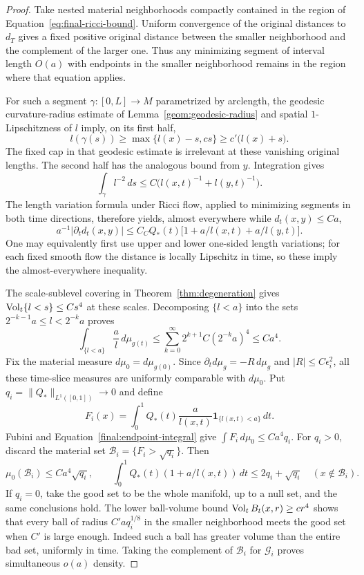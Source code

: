 \begin{proof}
Take nested material neighborhoods compactly contained in the region
of Equation~\eqref{eq:final-ricci-bound}.  Uniform convergence of the
original distances to $d_T$ gives a fixed positive original distance
between the smaller neighborhood and the complement of the larger
one.  Thus any minimizing segment of interval length $O(a)$ with
endpoints in the smaller neighborhood remains in the region where
that equation applies.

For such a segment $\gamma:[0,L]\to M$ parametrized by arclength,
the geodesic curvature-radius estimate of
Lemma~\ref{geom:geodesic-radius} and spatial $1$-Lipschitzness of $l$
imply, on its first half,
\[
 l(\gamma(s))\ge \max\{l(x)-s,cs\}
                  \ge c'\bigl(l(x)+s\bigr).
\]
The fixed cap in that geodesic estimate is irrelevant at these
vanishing original lengths.  The second half has the analogous
bound from $y$.  Integration gives
\begin{equation}\label{final:geodesic-integral}
 \int_\gamma l^{-2}\,ds
          \le C\bigl(l(x,t)^{-1}+l(y,t)^{-1}\bigr).
\end{equation}
The length variation formula under Ricci flow, applied to minimizing
segments in both time directions, therefore yields, almost everywhere
while $d_t(x,y)\le Ca$,
\begin{equation}\label{final:distance-derivative}
 a^{-1}|\partial_t d_t(x,y)|
 \le C_C Q_*(t)
         \bigl[1+a/l(x,t)+a/l(y,t)\bigr].
\end{equation}
One may equivalently first use upper and lower one-sided length
variations; for each fixed smooth flow the distance is locally
Lipschitz in time, so these imply the almost-everywhere inequality.

The scale-sublevel covering in Theorem~\ref{thm:degeneration} gives
$\operatorname{Vol}_t\{l<s\}\le Cs^4$ at these scales.  Decomposing $\{l<a\}$
into the sets $2^{-k-1}a\le l<2^{-k}a$ proves
\begin{equation}\label{final:endpoint-integral}
 \int_{\{l<a\}}\frac a l\,d\mu_{g(t)}
 \le\sum_{k=0}^\infty 2^{k+1}C(2^{-k}a)^4
 \le Ca^4.
\end{equation}
Fix the material measure $d\mu_0=d\mu_{g(0)}$.  Since
$\partial_t d\mu_g=-R\,d\mu_g$ and $|R|\le C\epsilon_i^2$,
all these time-slice measures are uniformly comparable with $d\mu_0$.
Put $q_i=\|Q_*\|_{L^1([0,1])}\to0$ and define
\[
 F_i(x)=\int_0^1 Q_*(t)\frac a{l(x,t)}
                          \mathbf1_{\{l(x,t)<a\}}\,dt.
\]
Fubini and Equation~\eqref{final:endpoint-integral} give
$\int F_i\,d\mu_0\le Ca^4q_i$.  For $q_i>0$, discard the material
set $\mathcal B_i=\{F_i>\sqrt{q_i}\}$.  Then
\[
 \mu_0(\mathcal B_i)\le Ca^4\sqrt{q_i},\qquad
 \int_0^1 Q_*(t)(1+a/l(x,t))\,dt
                    \le2q_i+\sqrt{q_i}\quad(x\notin\mathcal B_i).
\]
If $q_i=0$, take the good set to be the whole manifold, up to a
null set, and the same conclusions hold.  The lower ball-volume
bound $\operatorname{Vol}_t B_t(x,r)\ge cr^4$ shows that every ball of radius
$C'aq_i^{1/8}$ in the smaller neighborhood meets the good set when
$C'$ is large enough.  Indeed such a ball has greater volume than
the entire bad set, uniformly in time.  Taking the complement of
$\mathcal B_i$ for $\mathcal G_i$ proves simultaneous $o(a)$ density.


\end{proof}
